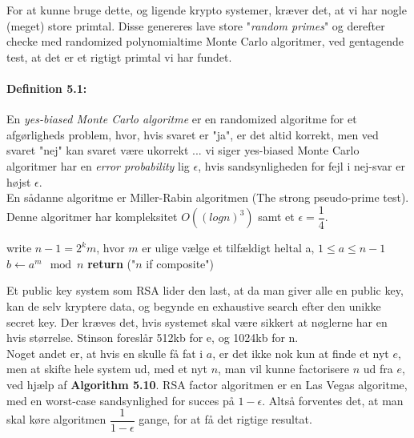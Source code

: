 \documentclass[paper=a4, fontsize=11pt]{scrartcl} %
\numberwithin{equation}{section} %
\numberwithin{figure}{section} %
\numberwithin{table}{section} %
\begin{document}
 	For at kunne bruge dette, og ligende krypto systemer, kræver det, at vi har nogle (meget) store primtal. Disse genereres lave store "\textit{random primes}" og derefter checke med randomized polynomialtime Monte Carlo algoritmer, ved gentagende test, at det er et rigtigt primtal vi har fundet. 
 	
 	\paragraph{\textbf{Definition 5.1:}} En \textit{yes-biased Monte Carlo algoritme} er en randomized algoritme for et afgørligheds problem, hvor, hvis svaret er "ja", er det altid korrekt, men ved svaret "nej" kan svaret være ukorrekt ... vi siger yes-biased Monte Carlo algoritmer har en \textit{error probability} lig $\epsilon$, hvis sandsynligheden for fejl i nej-svar er højst $\epsilon$. \\
 	
 	En sådanne algoritme er Miller-Rabin algoritmen (The strong pseudo-prime test). Denne algoritmer har kompleksitet $O((logn)^3)$ samt et $\epsilon=\dfrac{1}{4}$.
 	
 	\begin{mdframed}
 		\begin{algorithm}[H]
 		write $n-1=2^km$, hvor $m$ er ulige\;
 		vælge et tilfældigt heltal a, $1\leq a\leq n-1$\;
 		$b\leftarrow a^m\mod{n}$\;
 	 	\textbf{return} ("$n$ if composite")
 		\end{algorithm}
 	\end{mdframed}
 	
 	Et public key system som RSA lider den last, at da man giver alle en public key, kan de selv kryptere data, og begynde en exhaustive search efter den unikke secret key. Der kræves det, hvis systemet skal være sikkert at nøglerne har en hvis størrelse. Stinson foreslår 512kb for e, og 1024kb for n.  \\
 	
 	Noget andet er, at hvis en skulle få fat i $a$, er det ikke nok kun at finde et nyt $e$, men at skifte hele system ud, med et nyt $n$, man vil kunne factorisere $n$ ud fra $e$, ved hjælp af \textbf{Algorithm 5.10}. RSA factor algoritmen er en Las Vegas algoritme, med en worst-case sandsynlighed for succes på $1-\epsilon$. Altså forventes det, at man skal køre algoritmen $\dfrac{1}{1-\epsilon}$ gange, for at få det rigtige resultat. \\
 	
\end{document}

